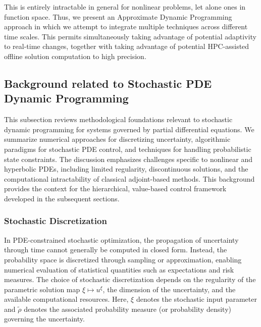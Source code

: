 \documentclass{article}
\newcommand{\1}{\mathds{1}}          %
\theoremstyle{definition}
\begin{document}
\begin{sloppypar}
This is entirely intractable in general for nonlinear problems, let alone ones in function space. Thus, we present an Approximate Dynamic Programming approach in which we attempt to integrate multiple techniques across different time scales. This permits simultaneously taking advantage of potential adaptivity to real-time changes, together with taking advantage of potential HPC-assisted offline solution computation to high precision. 

\subsection{Background related to Stochastic PDE Dynamic Programming}\label{sec:backgroundSPDEDP}


This subsection reviews methodological foundations relevant to stochastic dynamic
programming for systems governed by partial differential equations. We summarize
numerical approaches for discretizing uncertainty, algorithmic paradigms for
stochastic PDE control, and techniques for handling probabilistic state constraints.
The discussion emphasizes challenges specific to nonlinear and hyperbolic PDEs,
including limited regularity, discontinuous solutions, and the computational
intractability of classical adjoint-based methods. This background provides the
context for the hierarchical, value-based control framework developed in the
subsequent sections.




\subsubsection{Stochastic Discretization}
\label{subsect_stodis}



In PDE-constrained stochastic optimization, the propagation of uncertainty through
time cannot generally be computed in closed form. Instead, the probability space is
discretized through sampling or approximation, enabling numerical evaluation of
statistical quantities such as expectations and risk measures. The choice of
stochastic discretization depends on the regularity of the parametric solution map
$\xi \mapsto u^\xi$, the dimension of the uncertainty, and the available
computational resources. Here, $\xi$ denotes the stochastic input parameter and $\tilde{\rho}$ denotes the
associated probability measure (or probability density) governing the uncertainty.



\end{sloppypar}
\end{document}
